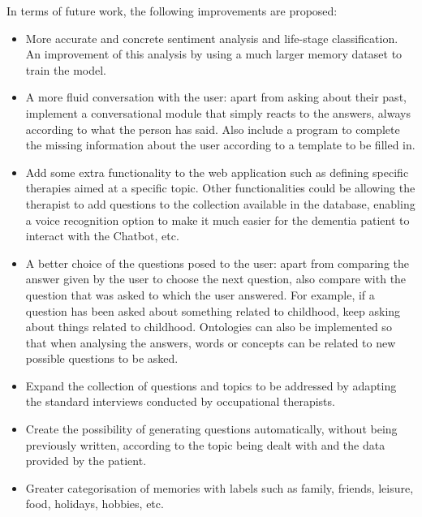 In terms of future work, the following improvements are proposed:

\begin{itemize}
	\item More accurate and concrete sentiment analysis and life-stage classification. An improvement of this analysis by using a much larger memory dataset to train the model.
	\item A more fluid conversation with the user: apart from asking about their past, implement a conversational module that simply reacts to the answers, always according to what the person has said. Also include a program to complete the missing information about the user according to a template to be filled in.
	\item Add some extra functionality to the web application such as defining specific therapies aimed at a specific topic. Other functionalities could be allowing the therapist to add questions to the collection available in the database, enabling a voice recognition option to make it much easier for the dementia patient to interact with the Chatbot, etc.
	\item A better choice of the questions posed to the user: apart from comparing the answer given by the user to choose the next question, also compare with the question that was asked to which the user answered. For example, if a question has been asked about something related to childhood, keep asking about things related to childhood. Ontologies can also be implemented so that when analysing the answers, words or concepts can be related to new possible questions to be asked.
	\item Expand the collection of questions and topics to be addressed by adapting the standard interviews conducted by occupational therapists.
	\item Create the possibility of generating questions automatically, without being previously written, according to the topic being dealt with and the data provided by the patient.
	\item Greater categorisation of memories with labels such as family, friends, leisure, food, holidays, hobbies, etc.
\end{itemize}














